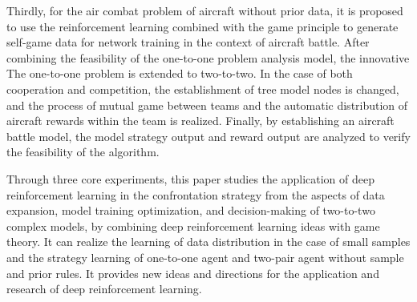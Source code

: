 \begin{englishabstract}
Thirdly, for the air combat problem of aircraft without prior data, it is proposed to use the reinforcement learning combined with the game principle to generate self-game data for network training in the context of aircraft battle. After combining the feasibility of the one-to-one problem analysis model, the innovative The one-to-one problem is extended to two-to-two. In the case of both cooperation and competition, the establishment of tree model nodes is changed, and the process of mutual game between teams and the automatic distribution of aircraft rewards within the team is realized. Finally, by establishing an aircraft battle model, the model strategy output and reward output are analyzed to verify the feasibility of the algorithm.

Through three core experiments, this paper studies the application of deep reinforcement learning in the confrontation strategy from the aspects of data expansion, model training optimization, and decision-making of two-to-two complex models, by combining deep reinforcement learning ideas with game theory. It can realize the learning of data distribution in the case of small samples and the strategy learning of one-to-one agent and two-pair agent without sample and prior rules. It provides new ideas and directions for the application and research of deep reinforcement learning.

\end{englishabstract}

